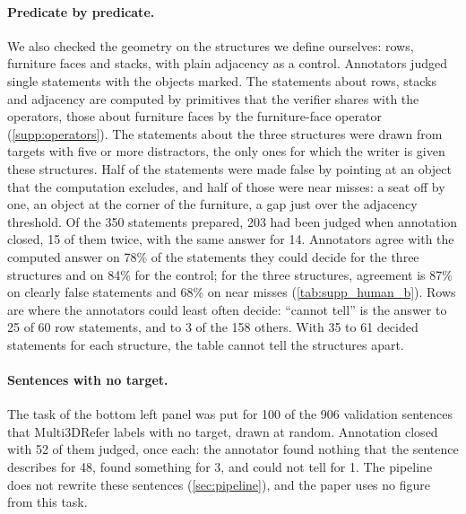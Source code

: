 \paragraph{Predicate by predicate.}
We also checked the geometry on the structures we define ourselves: rows, furniture faces and stacks, with plain adjacency as a control.
Annotators judged single statements with the objects marked.
The statements about rows, stacks and adjacency are computed by primitives that the verifier shares with the operators, those about furniture faces by the furniture-face operator (\cref{supp:operators}).
The statements about the three structures were drawn from targets with five or more distractors, the only ones for which the writer is given these structures.
Half of the statements were made false by pointing at an object that the computation excludes, and half of those were near misses: a seat off by one, an object at the corner of the furniture, a gap just over the adjacency threshold.
Of the 350 statements prepared, 203 had been judged when annotation closed, 15 of them twice, with the same answer for 14.
Annotators agree with the computed answer on 78\% of the statements they could decide for the three structures and on 84\% for the control; for the three structures, agreement is 87\% on clearly false statements and 68\% on near misses (\cref{tab:supp_human_b}).
Rows are where the annotators could least often decide: ``cannot tell'' is the answer to 25 of 60 row statements, and to 3 of the 158 others.
With 35 to 61 decided statements for each structure, the table cannot tell the structures apart.


\paragraph{Sentences with no target.}
The task of the bottom left panel was put for 100 of the 906 validation sentences that Multi3DRefer labels with no target, drawn at random.
Annotation closed with 52 of them judged, once each: the annotator found nothing that the sentence describes for 48, found something for 3, and could not tell for 1.
The pipeline does not rewrite these sentences (\cref{sec:pipeline}), and the paper uses no figure from this task.

